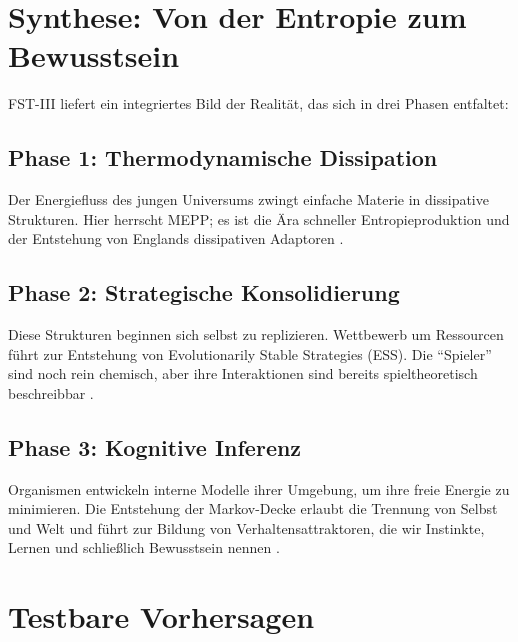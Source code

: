\documentclass[12pt,a4paper]{article}
\theoremstyle{remark}
\begin{document}
\section{Synthese: Von der Entropie zum Bewusstsein}
\label{sec:synthesis}

FST-III liefert ein integriertes Bild der Realit\"at, das sich in drei Phasen entfaltet:

\subsection{Phase 1: Thermodynamische Dissipation}

Der Energiefluss des jungen Universums zwingt einfache Materie in dissipative Strukturen. Hier herrscht MEPP; es ist die \"Ara schneller Entropieproduktion und der Entstehung von Englands dissipativen Adaptoren \citep{EcosystemMEPP}.

\subsection{Phase 2: Strategische Konsolidierung}

Diese Strukturen beginnen sich selbst zu replizieren. Wettbewerb um Ressourcen f\"uhrt zur Entstehung von Evolutionarily Stable Strategies (ESS). Die ``Spieler'' sind noch rein chemisch, aber ihre Interaktionen sind bereits spieltheoretisch beschreibbar \citep{MaynardSmithPrice1973}.

\subsection{Phase 3: Kognitive Inferenz}

Organismen entwickeln interne Modelle ihrer Umgebung, um ihre freie Energie zu minimieren. Die Entstehung der Markov-Decke erlaubt die Trennung von Selbst und Welt und f\"uhrt zur Bildung von Verhaltensattraktoren, die wir Instinkte, Lernen und schlie\ss{}lich Bewusstsein nennen \citep{FristonFreeEnergy}.

\section{Testbare Vorhersagen}
\label{sec:predictions}
\end{document}
